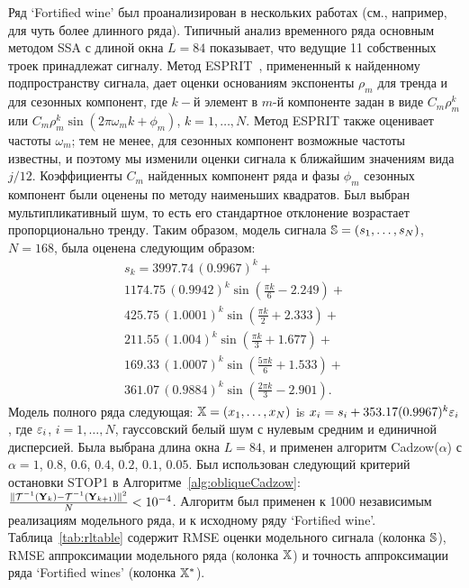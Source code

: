 \documentclass[12pt, specialist, subf,href,colorlinks=true,substylefile = spbu.rtx]{disser}
\theoremstyle{remark}
\theoremstyle{definition}
\begin{document}
Ряд `Fortified wine' был проанализирован в нескольких работах (см., например, \cite{Golyandina.etal2015} для чуть более длинного ряда). Типичный анализ временного ряда основным методом SSA с длиной окна $L=84$ показывает, что ведущие 11 собственных троек
принадлежат сигналу. Метод ESPRIT~\cite{Roy.Kailath1989,Golyandina.Zhigljavsky2012}, примененный к найденному подпространству сигнала, дает оценки основаниям экспоненты $\rho_m$ для тренда и для сезонных компонент, где $k-$й элемент в $m$-й компоненте задан в виде $C_m \rho_m^k$ или $C_m \rho_m^k \sin(2\pi\omega_m k +\phi_m)$, $k=1,\ldots,N$. Метод ESPRIT также оценивает частоты $\omega_m$; тем не менее, для сезонных компонент возможные частоты известны, и поэтому мы изменили оценки сигнала к ближайшим значениям вида $j/12$. Коэффициенты $C_m$ найденных компонент ряда и фазы $\phi_m$ сезонных компонент были оценены по методу наименьших квадратов. Был выбран мультипликативный шум, то есть его стандартное отклонение возрастает пропорционально тренду.
Таким образом, модель сигнала $\mathbb{S} = (s_{1}, \ldots, s_N)$, $N=168$, была оценена следующим образом:
%
%
\begin{multline*}
s_{k} = 3997.74\, (0.9967)^k + \\
1174.75\, (0.9942)^k \sin(\frac{\pi k}{6} - 2.249) + \\
425.75\, (1.0001)^k \sin(\frac{\pi k}{2} + 2.333) + \\
211.55\, (1.004)^k \sin(\frac{\pi k}{3} + 1.677) + \\
169.33\, (1.0007)^k \sin(\frac{5 \pi k}{6} + 1.533) + \\
361.07\, (0.9884)^k \sin(\frac{2 \pi k}{3} - 2.901).
\end{multline*}
Модель полного ряда следующая: $\mathbb{X}=(x_1,\ldots,x_N)$ is $x_i=s_i + 353.17 (0.9967)^k \varepsilon_i$,
где  $\varepsilon_i$, $i=1,\ldots,N$,  гауссовский белый шум с нулевым средним и единичной дисперсией.
Была выбрана длина окна $L=84$, и применен алгоритм Cadzow($\alpha$) с $\alpha=1$, $0.8$, $0.6$, $0.4$, $0.2$, $0.1$, $0.05$.
Был использован следующий критерий остановки STOP1 в Алгоритме~\ref{alg:obliqueCadzow}:
$\frac{\|\mathcal{T}^{-1}(\mathbf{Y}_k) - \mathcal{T}^{-1}(\mathbf{Y}_{k + 1})\|^2}{N} <10^{-4}$.
Алгоритм был применен к 1000 независимым реализациям модельного ряда, и к исходному ряду `Fortified wine'.
Таблица~\ref{tab:rltable} содержит RMSE оценки модельного сигнала (колонка $\mathbb{S}$),
RMSE аппроксимации модельного ряда (колонка $\mathbb{X}$) и точность аппроксимации ряда
`Fortified wines' (колонка $\mathbb{X}^*$).
\end{document}
